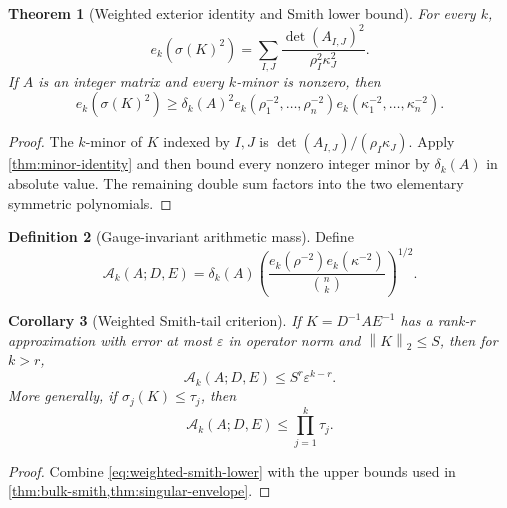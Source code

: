 \documentclass[11pt,oneside]{article}
\newtheorem{theorem}{Theorem}[section]
\newtheorem{corollary}[theorem]{Corollary}
\theoremstyle{definition}
\newtheorem{definition}[theorem]{Definition}
\theoremstyle{remark}
\newcommand{\norm}[1]{\left\lVert #1\right\rVert}
\newcommand{\eps}{\varepsilon}
\begin{document}
\begin{theorem}[Weighted exterior identity and Smith lower bound]
\label{thm:weighted-exterior}
For every $k$,
\begin{equation}
 e_k(\sigma(K)^2)
 =\sum_{I,J}\frac{\det(A_{I,J})^2}{\rho_I^2\kappa_J^2}.
 \label{eq:weighted-minor-sum}
\end{equation}
If $A$ is an integer matrix and every $k$-minor is nonzero, then
\begin{equation}
 e_k(\sigma(K)^2)
 \ge \delta_k(A)^2
 e_k(\rho_1^{-2},\dots,\rho_n^{-2})
 e_k(\kappa_1^{-2},\dots,\kappa_n^{-2}).
 \label{eq:weighted-smith-lower}
\end{equation}
\end{theorem}

\begin{proof}
The $k$-minor of $K$ indexed by $I,J$ is $\det(A_{I,J})/(\rho_I\kappa_J)$.  Apply \cref{thm:minor-identity} and then bound every nonzero integer minor by $\delta_k(A)$ in absolute value.  The remaining double sum factors into the two elementary symmetric polynomials.
\end{proof}

\begin{definition}[Gauge-invariant arithmetic mass]
Define
\begin{equation}
 \mathcal A_k(A;D,E)
 =\delta_k(A)
 \left(
 \frac{e_k(\rho^{-2})e_k(\kappa^{-2})}{\binom nk}
 \right)^{1/2}.
 \label{eq:arithmetic-mass}
\end{equation}
\end{definition}

\begin{corollary}[Weighted Smith-tail criterion]
\label{cor:weighted-tail}
If $K=D^{-1}AE^{-1}$ has a rank-$r$ approximation with error at most $\eps$ in operator norm and $\norm K_2\le S$, then for $k>r$,
\begin{equation}
 \boxed{
 \mathcal A_k(A;D,E)\le S^r\eps^{k-r}.}
 \label{eq:weighted-tail}
\end{equation}
More generally, if $\sigma_j(K)\le\tau_j$, then
\begin{equation}
 \boxed{
 \mathcal A_k(A;D,E)\le\prod_{j=1}^k\tau_j.}
 \label{eq:weighted-envelope}
\end{equation}
\end{corollary}

\begin{proof}
Combine \eqref{eq:weighted-smith-lower} with the upper bounds used in \cref{thm:bulk-smith,thm:singular-envelope}.
\end{proof}
\end{document}
